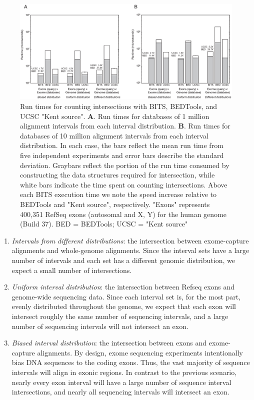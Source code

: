 \documentclass{bioinfo}
\begin{document}
\begin{figure}[btp]
	\centering
	\includegraphics[width=7in]{figures/seq-counting.eps}
	\caption[]{Run times for counting intersections with 
	BITS, BEDTools, and UCSC "Kent source".  \textbf{A}. Run times for databases
	of 1 million alignment intervals from each interval distribution.
	\textbf{B}.  Run times for databases of 10 million alignment intervals from
	each interval distribution.  In each case, the bars reflect the mean run
	time from five independent experiments and error bars describe the standard
	deviation.  Graybars reflect the portion of the run time consumed by
	constructing the data structures required for intersection, while white bars
	indicate the time spent on counting intersections.  Above each BITS
	execution time we note the speed increase relative to BEDTools and "Kent
	source", respectively. "Exons" represents 400,351 RefSeq exons (autosomal
	and X, Y) for the human genome (Build 37).  BED = BEDTools; UCSC = "Kent
	source"}
\end{figure}

\begin{enumerate}
	\item {\em Intervals from different distributions}:
	the intersection between exome-capture alignments and whole-genome
	alignments. Since the interval sets have a large number of intervals and
	each set has a different genomic distribution, we expect a small number of
	intersections.
	
	\item {\em Uniform interval distribution}:
	the intersection between Refseq exons and genome-wide sequencing data.
	Since each interval set is, for the most part, evenly distributed throughout
	the genome, we expect that each exon will intersect roughly the same number
	of sequencing intervals, and a large number of sequencing intervals will not
	intersect an exon.

	\item {\em Biased interval distribution}:
	the intersection between exons and exome-capture alignments. By design, 
	exome sequencing experiments intentionally bias DNA sequences to the coding
	exons. Thus, the vast majority of sequence intervals will align in exonic
	regions. In contrast to the previous scenario, nearly every exon interval
	will have a large number of sequence interval intersections, and nearly all
	sequencing intervals will intersect an exon.
\end{enumerate}
        
\end{document}
